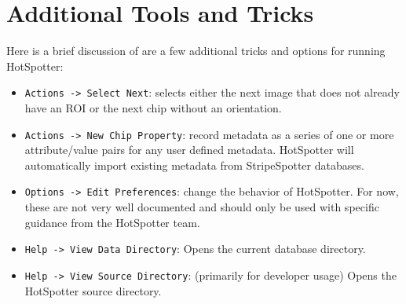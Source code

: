 \documentclass[a4paper,10pt]{article}
\begin{document}
\section{Additional Tools and Tricks}


Here is a brief discussion of are a few additional tricks and options
for running HotSpotter:
\begin{itemize}
\item \verb+Actions -> Select Next+:
    selects either the next image that does not already have an ROI or the next chip without an
    orientation. 

\item \verb+Actions -> New Chip Property+:  
    record metadata as a series of one or more attribute/value pairs for any
    user defined metadata.  HotSpotter will automatically import existing
    metadata from StripeSpotter databases.



\item \verb+Options -> Edit Preferences+: 
    change the behavior of HotSpotter. For now, these are not very well
    documented and should only be used with specific guidance from 
    the HotSpotter team.




\item \verb+Help -> View Data Directory+: 
    Opens the current database directory.

\item \verb+Help -> View Source Directory+: (primarily for developer usage)
    Opens the HotSpotter source directory. 


\end{itemize}
\end{document}
